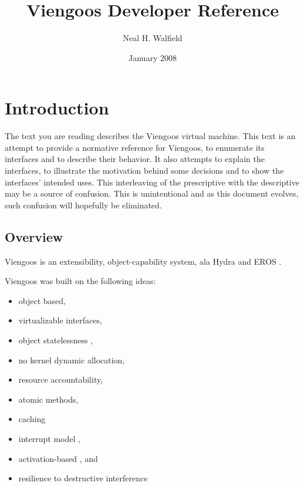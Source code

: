 \documentclass[12pt,a4paper]{book}
\title{Viengoos Developer Reference}
\author{Neal H. Walfield}
\date{January 2008}
\begin{document}
\frontmatter
\maketitle
\tableofcontents

\mainmatter

\setlength{\parindent}{0pt}
\setlength{\parskip}{1ex plus 0.5ex minus 0.2ex}

\chapter{Introduction}

The text you are reading describes the Viengoos virtual machine.  This
text is an attempt to provide a normative reference for Viengoos, to
enumerate its interfaces and to describe their behavior.  It also
attempts to explain the interfaces, to illustrate the motivation
behind some decisions and to show the interfaces' intended uses.  This
interleaving of the prescriptive with the descriptive may be a source
of confusion.  This is unintentional and as this document evolves,
such confusion will hopefully be eliminated.

\section{Overview}

Viengoos is an extensibility, object-capability system, ala Hydra
\cite{wulf74hydra} and EROS \cite{shapiro99eros}.  

Viengoos was built on the following ideas:

\begin{itemize}
\item object based,
\item virtualizable interfaces,
\item object statelessness \cite{tullmann96userlevel-checkpointing-through-exportable-kernel-state},
\item no kernel dynamic allocation,
\item resource accountability,
\item atomic methods,
\item caching \cite{cheriton94caching-model-of-os-kernel-functionality}
\item interrupt model \cite{ford99interface-and-execution-models},
\item activation-based \cite{roscoe95structure-of-a-multi-service-os}, and
\item resilience to destructive interference \cite{miller06robust-composition}
\end{itemize}
\end{document}
